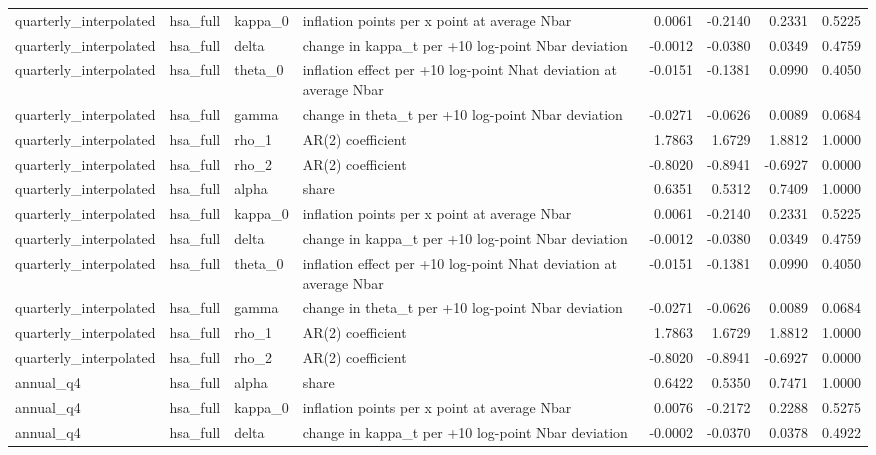 \begin{tabular}{llllrrrr}
quarterly\_interpolated & hsa\_full & kappa\_0 & inflation points per x point at average Nbar & 0.0061 & -0.2140 & 0.2331 & 0.5225 \\
quarterly\_interpolated & hsa\_full & delta & change in kappa\_t per +10 log-point Nbar deviation & -0.0012 & -0.0380 & 0.0349 & 0.4759 \\
quarterly\_interpolated & hsa\_full & theta\_0 & inflation effect per +10 log-point Nhat deviation at average Nbar & -0.0151 & -0.1381 & 0.0990 & 0.4050 \\
quarterly\_interpolated & hsa\_full & gamma & change in theta\_t per +10 log-point Nbar deviation & -0.0271 & -0.0626 & 0.0089 & 0.0684 \\
quarterly\_interpolated & hsa\_full & rho\_1 & AR(2) coefficient & 1.7863 & 1.6729 & 1.8812 & 1.0000 \\
quarterly\_interpolated & hsa\_full & rho\_2 & AR(2) coefficient & -0.8020 & -0.8941 & -0.6927 & 0.0000 \\
quarterly\_interpolated & hsa\_full & alpha & share & 0.6351 & 0.5312 & 0.7409 & 1.0000 \\
quarterly\_interpolated & hsa\_full & kappa\_0 & inflation points per x point at average Nbar & 0.0061 & -0.2140 & 0.2331 & 0.5225 \\
quarterly\_interpolated & hsa\_full & delta & change in kappa\_t per +10 log-point Nbar deviation & -0.0012 & -0.0380 & 0.0349 & 0.4759 \\
quarterly\_interpolated & hsa\_full & theta\_0 & inflation effect per +10 log-point Nhat deviation at average Nbar & -0.0151 & -0.1381 & 0.0990 & 0.4050 \\
quarterly\_interpolated & hsa\_full & gamma & change in theta\_t per +10 log-point Nbar deviation & -0.0271 & -0.0626 & 0.0089 & 0.0684 \\
quarterly\_interpolated & hsa\_full & rho\_1 & AR(2) coefficient & 1.7863 & 1.6729 & 1.8812 & 1.0000 \\
quarterly\_interpolated & hsa\_full & rho\_2 & AR(2) coefficient & -0.8020 & -0.8941 & -0.6927 & 0.0000 \\
annual\_q4 & hsa\_full & alpha & share & 0.6422 & 0.5350 & 0.7471 & 1.0000 \\
annual\_q4 & hsa\_full & kappa\_0 & inflation points per x point at average Nbar & 0.0076 & -0.2172 & 0.2288 & 0.5275 \\
annual\_q4 & hsa\_full & delta & change in kappa\_t per +10 log-point Nbar deviation & -0.0002 & -0.0370 & 0.0378 & 0.4922 \\

\end{tabular}
